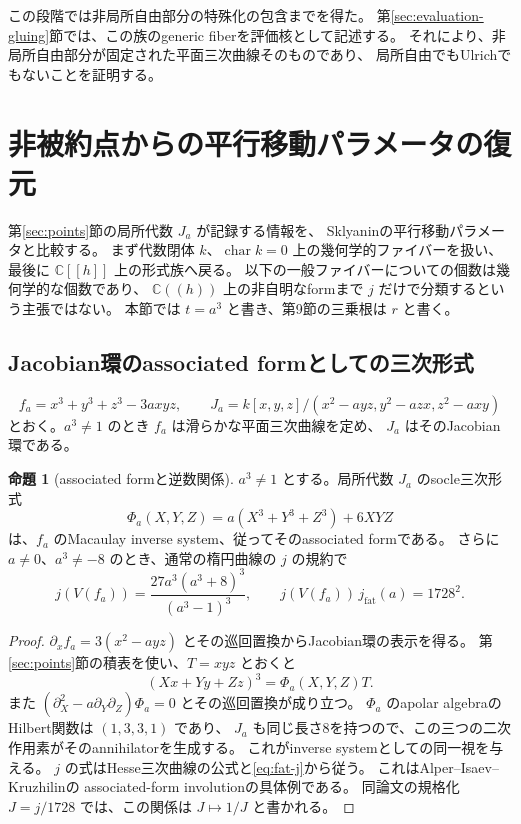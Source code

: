 \documentclass[a4paper,11pt]{ltjsarticle}
\theoremstyle{definition}
\newtheorem{theorem}{命題}[section]
\newcommand{\CC}{\mathbb C}
\begin{document}
この段階では非局所自由部分の特殊化の包含までを得た。
第\ref{sec:evaluation-gluing}節では、この族のgeneric fiberを評価核として記述する。
それにより、非局所自由部分が固定された平面三次曲線そのものであり、
局所自由でもUlrichでもないことを証明する。

\section{非被約点からの平行移動パラメータの復元}\label{sec:reconstruction}

第\ref{sec:points}節の局所代数 $J_a$ が記録する情報を、
Sklyaninの平行移動パラメータと比較する。
まず代数閉体 $k$、$\operatorname{char}k=0$ 上の幾何学的ファイバーを扱い、
最後に $\CC[[h]]$ 上の形式族へ戻る。
以下の一般ファイバーについての個数は幾何学的な個数であり、
$\CC((h))$ 上の非自明なformまで $j$ だけで分類するという主張ではない。
本節では $t=a^3$ と書き、第9節の三乗根は $r$ と書く。

\subsection{Jacobian環のassociated formとしての三次形式}

\[
 f_a=x^3+y^3+z^3-3axyz,\qquad
 J_a=k[x,y,z]/(x^2-ayz,y^2-azx,z^2-axy)
\]
とおく。$a^3\ne1$ のとき $f_a$ は滑らかな平面三次曲線を定め、
$J_a$ はそのJacobian環である。

\begin{theorem}[associated formと逆数関係]\label{thm:fat-associated}
$a^3\ne1$ とする。局所代数 $J_a$ のsocle三次形式
\[
 \Phi_a(X,Y,Z)=a(X^3+Y^3+Z^3)+6XYZ
\]
は、$f_a$ のMacaulay inverse system、従ってそのassociated formである。
さらに $a\ne0$、$a^3\ne-8$ のとき、通常の楕円曲線の $j$ の規約で
\begin{equation}\label{eq:associated-reciprocal-j}
 j(V(f_a))=\frac{27a^3(a^3+8)^3}{(a^3-1)^3},\qquad
 j(V(f_a))\,j_{\mathrm{fat}}(a)=1728^2.
\end{equation}
\end{theorem}

\begin{proof}
$\partial_x f_a=3(x^2-ayz)$ とその巡回置換からJacobian環の表示を得る。
第\ref{sec:points}節の積表を使い、$T=xyz$ とおくと
\[
 (Xx+Yy+Zz)^3=\Phi_a(X,Y,Z)T.
\]
また $(\partial_X^2-a\partial_Y\partial_Z)\Phi_a=0$ とその巡回置換が成り立つ。
$\Phi_a$ のapolar algebraのHilbert関数は $(1,3,3,1)$ であり、
$J_a$ も同じ長さ8を持つので、この三つの二次作用素がそのannihilatorを生成する。
これがinverse systemとしての同一視を与える。
$j$ の式はHesse三次曲線の公式と\eqref{eq:fat-j}から従う。
これはAlper--Isaev--Kruzhilin\cite[Section 3.2, (3.11), (3.18)]{AIK}の
associated-form involutionの具体例である。
同論文の規格化 $J=j/1728$ では、この関係は $J\mapsto1/J$ と書かれる。
\end{proof}
\end{document}
